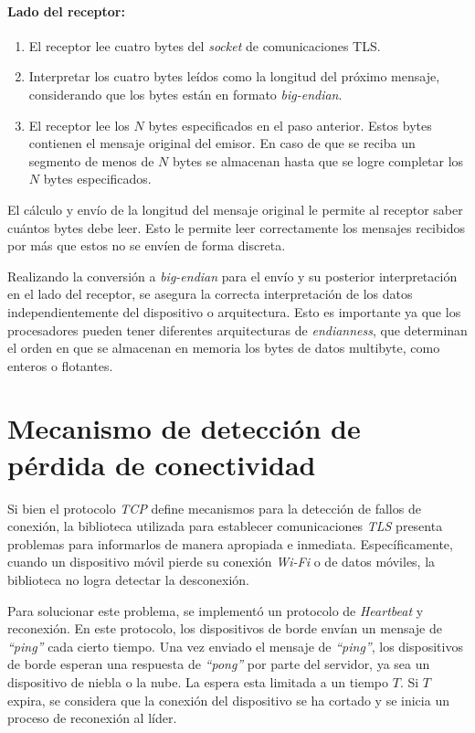 \paragraph{Lado del receptor:}
\begin{enumerate}
    \item El receptor lee cuatro bytes del \textit{socket} de comunicaciones TLS.
    \item Interpretar los cuatro bytes leídos como la longitud del próximo mensaje, considerando que los bytes están en formato \textit{big-endian}.
    \item El receptor lee los $N$ bytes especificados en el paso anterior. Estos bytes contienen el mensaje original del emisor. En caso de que se reciba un segmento de menos de $N$ bytes se almacenan hasta que se logre completar los $N$ bytes especificados.
    
\end{enumerate}
El cálculo y envío de la longitud del mensaje original le permite al receptor saber cuántos bytes debe leer. Esto le permite leer correctamente los mensajes recibidos por más que estos no se envíen de forma discreta.

Realizando la conversión a \textit{big-endian} para el envío y su posterior interpretación en el lado del receptor, se asegura la correcta interpretación de los datos independientemente del dispositivo o arquitectura. Esto es importante ya que los procesadores pueden tener diferentes arquitecturas de \textit{endianness}, que determinan el orden en que se almacenan en memoria los bytes de datos multibyte, como enteros o flotantes.

\section{Mecanismo de detección de pérdida de conectividad}
\label{sec:perdidaConect}
Si bien el protocolo \textit{TCP} define mecanismos para la detección de fallos de conexión, la biblioteca utilizada para establecer comunicaciones \textit{TLS} presenta problemas para informarlos de manera apropiada e inmediata. Específicamente, cuando un dispositivo móvil pierde su conexión \textit{Wi-Fi} o de datos móviles, la biblioteca no logra detectar la desconexión. 

Para solucionar este problema, se implementó un protocolo de \textit{Heartbeat} y reconexión. En este protocolo, los dispositivos de borde envían un mensaje de \textit{``ping''} cada cierto tiempo. Una vez enviado el mensaje de \textit{``ping''}, los dispositivos de borde esperan una respuesta de \textit{``pong''} por parte del servidor, ya sea un dispositivo de niebla o la nube. La espera esta limitada a un tiempo $T$. Si $T$ expira, se considera que la conexión del dispositivo se ha cortado y se inicia un proceso de reconexión al líder. 

